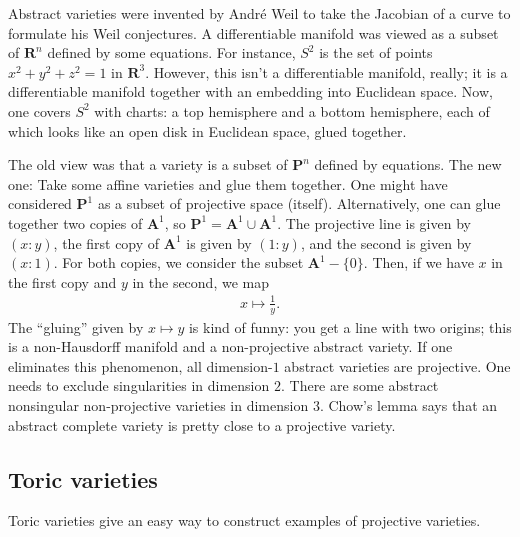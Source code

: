 \documentclass [11 pt, oneside, margin = 1 in] {article}
\begin{document}
Abstract varieties were invented by Andr\'e Weil to take the Jacobian of a curve to formulate his Weil conjectures. A differentiable manifold was viewed as a subset of $\mathbf{R}^n$ defined by some equations. For instance, $S^2$ is the set of points $x^2+y^2+z^2=1$ in $\mathbf{R}^3$. However, this isn't a differentiable manifold, really; it is a differentiable manifold together with an embedding into Euclidean space. Now, one covers $S^2$ with charts: a top hemisphere and a bottom hemisphere, each of which looks like an open disk in Euclidean space, glued together. 

The old view was that a variety is a subset of $\mathbf{P}^n$ defined by equations. The new one: Take some affine varieties and glue them together. One might have considered $\mathbf{P}^1$ as a subset of projective space (itself). Alternatively, one can glue together two copies of $\mathbf{A}^1$, so $\mathbf{P}^1=\mathbf{A}^1\cup \mathbf{A}^1$. The projective line is given by $(x:y)$, the first copy of $\mathbf{A}^1$ is given by $(1:y)$, and the second is given by $(x:1)$. For both copies, we consider the subset $\mathbf{A}^1-\{0\}$. Then, if we have $x$ in the first copy and $y$ in the second, we map 
\begin{align*}
	x\longmapsto \frac{1}{y}.
\end{align*}
The ``gluing'' given by $x\longmapsto y$ is kind of funny: you get a line with two origins; this is a non-Hausdorff manifold and a non-projective abstract variety. If one eliminates this phenomenon, all dimension-$1$ abstract varieties are projective. One needs to exclude singularities in dimension $2$. There are some abstract nonsingular non-projective varieties in dimension $3$. Chow's lemma says that an abstract complete variety is pretty close to a projective variety. 

\subsection{Toric varieties}
Toric varieties give an easy way to construct examples of projective varieties.
\end{document}
